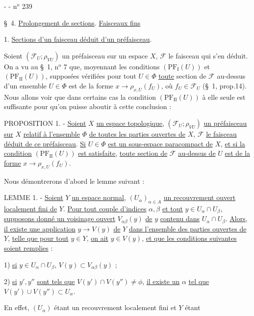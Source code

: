 -  - \hfill n$^{\mathrm{o}}$ 239

\S\ 4. \uline{Prolongement de sections}. \uline{Faisceaux fins}

1. \uline{Sections d'un faisceau déduit d'un préfaisceau}.

Soient $(\mathcal F_U;\rho_{VU})$ un préfaisceau sur un espace $X$, $\mathcal F$ le faisceau qui s'en déduit. On a vu au \S\ 1, n$^{\mathrm{o}}$ 7 que, moyennant les conditions $(\mathrm{PF}_{\mathrm I}(U))$ et $(\mathrm{PF}_{\mathrm{II}}(U))$, supposées vérifiées pour tout $U\in\Phi$ \uline{toute} section de $\mathcal F$ au-dessus d'un ensemble $U\in\Phi$ est de la forme $x\longrightarrow\rho_{x,U}(f_U)$, où $f_U\in\mathcal F_U$ (\S\ 1, prop.14). Nous allons voir que dans certains cas la condition $(\mathrm{PF}_{\mathrm{II}}(U))$ à elle seule est suffisante pour qu'on puisse aboutir à cette conclusion :

PROPOSITION 1. - \uline{Soient} $X$ \uline{un espace topologique}, $(\mathcal F_U;\rho_{VU})$ \uline{un préfaisceau sur} $X$ \uline{relatif à l'ensemble} $\Phi$ \uline{de toutes les parties ouvertes de} $X$, $\mathcal F$ \uline{le faisceau déduit de ce préfaisceau}. \uline{Si} $U\in\Phi$ \uline{est un sous-espace paracompact de} $X$, \uline{et si la condition} $(\mathrm{PF}_{\mathrm{II}}(U))$ \uline{est satisfaite}, \uline{toute section de} $\mathcal F$ \uline{au-dessus de} $U$ \uline{est de la forme} $x\longrightarrow\rho_{x,U}(f_U)$.

Nous démontrerons d'abord le lemme suivant :

LEMME 1. - \uline{Soient} $Y$ \uline{un espace normal}, $(U_\alpha)_{\alpha\in A}$ \uline{un recouvrement ouvert localement fini de} $Y$. \uline{Pour tout couple d'indices} $\alpha,\beta$ \uline{et tout} $y\in U_\alpha\cap U_\beta$, \uline{supposons donné un voisinage ouvert} $V_{\alpha\beta}(y)$ \uline{de} $y$ \uline{contenu dans} $U_\alpha\cap U_\beta$. \uline{Alors}, \uline{il existe une application} $y\longrightarrow V(y)$ \uline{de} $Y$ \uline{dans l'ensemble des parties ouvertes de} $Y$, \uline{telle que pour tout} $y\in Y$, \uline{on ait} $y\in V(y)$, \uline{et que les conditions suivantes soient remplies} :

1) \uline{si} $y\in U_\alpha\cap U_\beta$, $V(y)\subset V_{\alpha\beta}(y)$ ;

2) \uline{si} $y',y''$ \uline{sont tels que} $V(y')\cap V(y'')\ne\phi$, \uline{il existe un} $\alpha$ \uline{tel que} $V(y')\cup V(y'')\subset U_\alpha$.

En effet, $(U_\alpha)$ étant un recouvrement localement fini et $Y$ étant
